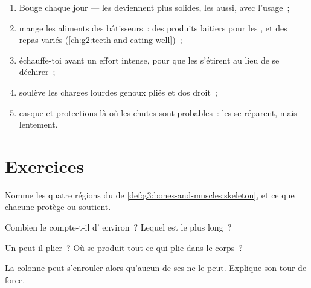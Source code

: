\begin{method}\label{met:g3:bones-and-muscles:care}
\begin{enumerate}
  \item Bouge chaque jour --- les  deviennent plus solides, les
         aussi, avec l'usage~;
  \item mange les aliments des bâtisseurs~: des produits laitiers
        pour les , et des repas variés
        (\cref{ch:g2:teeth-and-eating-well})~;
  \item échauffe-toi avant un effort intense, pour que les 
        s'étirent au lieu de se déchirer~;
  \item soulève les charges lourdes genoux pliés et dos droit~;
  \item casque et protections là où les chutes sont probables~: les
         se réparent, mais lentement.
\end{enumerate}
\end{method}

\section{Exercices}

\begin{exercise}[$\star$]\label{exo:g3:bones-and-muscles:1}
Nomme les quatre régions du  de
\cref{def:g3:bones-and-muscles:skeleton}, et ce que chacune protège
ou soutient.
\end{exercise}

\begin{exercise}[$\star$]\label{exo:g3:bones-and-muscles:2}
Combien le  compte-t-il d' environ~? Lequel est le plus
long~?
\end{exercise}

\begin{exercise}[$\star$]\label{exo:g3:bones-and-muscles:3}
Un  peut-il plier~? Où se produit tout ce qui plie dans le corps~?
\end{exercise}

\begin{exercise}[$\star$]\label{exo:g3:bones-and-muscles:4}
La colonne peut s'enrouler alors qu'aucun de ses  ne le peut.
Explique son tour de force.
\end{exercise}

